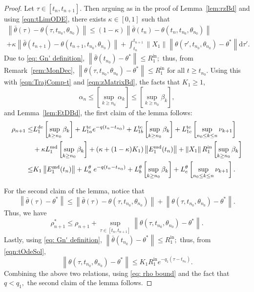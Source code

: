 \documentclass[usenames,dvipsnames,final,12pt]{colt2018} %
\newcommand{\Xt}{X_1}
\newcommand{\lt}{q_1}
\newcommand{\Rti}{R_1^{\textrm{in}}}
\newcommand{\thS}{\theta^*}
\newcommand{\rt}{\rho}
\newcommand{\rtS}{\rho^{*}}
\newcommand{\bart}{\bar{\theta}}
\newcommand{\Et}{E_1}
\newcommand{\Kt}{K_1}
\newcommand{\tSol}[1]{\theta(#1, \tI{n_0}, \theta_{n_0})}
\newcommand{\EtM}{\Et^{\md}}
\newcommand{\LtD}{L_1^{\dt}}
\newcommand{\LtM}{L_1^{\md}}
\newcommand{\LtT}[1]{L_{1 #1}^{\te}}
\newcommand{\Lt}[1]{L^{\theta}_{#1}}
\newcommand{\lm}{q}
\newcommand{\dt}{\text{de}}
\newcommand{\md}{\text{md}}
\newcommand{\te}{\text{te}}
\newcommand{\df}{\mathrm{d}}
\newcommand{\tI}[1]{t_{#1}}
\newcommand{\norm}[1]{\left\lVert#1\right\rVert}
\newcommand{\gal}[1]{#1}
\begin{document}
\begin{proof}
Let $\tau \in [\tI{n}, \tI{n + 1}].$ Then arguing as in \gal{the} proof of Lemma~\ref{lem:rzBd}
 and using \eqref{eqn:tLimODE}, there exists $\kappa \in [0,1]$ such that
%
\begin{multline*}
\norm{\bart(\tau) - \tSol{\tau}} \leq (1 - \kappa) \norm{\bart(\tI{n}) - \tSol{\tI{n}}}\\
+ \kappa \norm{\bart(\tI{n + 1}) - \tSol{\tI{n + 1}}} +  \int_{\tI{n}}^{\tI{n + 1}} \norm{\Xt} \norm{\tSol{\tau'} - \thS} \df \tau'.
\end{multline*}
%
\gal{Due to \eqref{eq: Gn' definition},} $\norm{\bart(\tI{n_0}) - \thS} \leq \Rti;$ thus, from Remark~\ref{rem:MonDec}, $\norm{\tSol{\tau} - \thS} \leq \Rti$ for all $t \geq \tI{n_0}.$ Using this with \eqref{eqn:TrajComp-t} and \eqref{eqn:zMatrixBd}, the facts that $\Kt \geq 1$,
%
\[
\alpha_n \leq \left[\sup_{k \geq n_0} \alpha_k\right] \leq \left[\sup_{k \geq n_0} \beta_k\right],
\]
and Lemma~\ref{lem:EtDBd}, the first claim of the lemma follows:
\begin{align}
\rt_{n + 1}
\leq &
\LtD\left[\sup_{k \geq n_0} \beta_{k}\right] + \LtT{a}e^{-q(\tI{n} - \tI{n_0})}
+ \LtT{b} \left[\sup_{k \geq n_0} \beta_k\right] + \LtT{c}\left[\sup_{n_0 \leq k \leq n} \nu_{k + 1}\right] \notag \\
& + \kappa \LtM \left[\sup_{k \geq n_0} \beta_k\right] + (\kappa + (1-\kappa)\Kt)\norm{\EtM(\tI{n})} + \norm{\Xt}\Rti\left[\sup_{k \geq n_0} \beta_k\right]
\notag
\\
\leq & \Kt \norm{\EtM(\tI{n})} + \Lt{a} \; e^{-q(\tI{n} - \tI{n_0})} + \Lt{b} \left[\sup_{k \geq n_0} \beta_k\right] + \Lt{c}\left[\sup_{n_0 \leq k \leq n} \nu_{k + 1}\right].
\label{eq: rho bound}
\end{align}

For the second claim of the lemma, notice that
\[
\norm{\bart(\tau) - \thS}  \leq  \norm{\bart(\tau) - \tSol{\tau}}
+ \norm{\tSol{\tau} - \thS}.
\]
%
Thus, we have
%
\[
\rtS_{n + 1} \leq \rt_{n + 1} + \sup_{\tau \in [\tI{n}, \tI{n + 1}]} \norm{\tSol{\tau} - \thS}.
\]
%
Lastly, \gal{using \eqref{eq: Gn' definition},} $\norm{\bart(\tI{n_0}) - \thS} \leq \Rti;$ thus, from \eqref{eqn:tOdeSol},
%
\[
\norm{\tSol{\tau} - \thS} \leq \Kt \Rti e^{-\lt(\tau - \tI{n_0})}.
\]
%
Combining the above two relations, using \eqref{eq: rho bound} and the fact that $\lm < \lt,$ the second claim of the lemma follows.
\end{proof}
\end{document}
